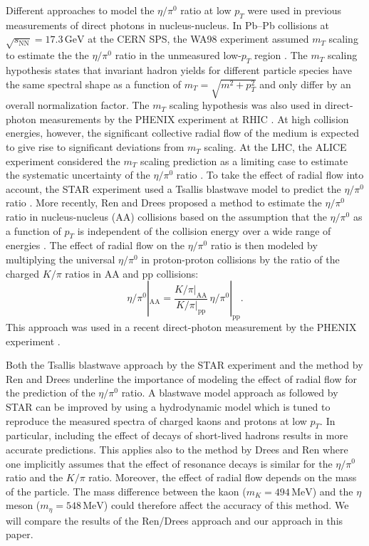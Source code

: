 \documentclass[%
 reprint,
 amsmath,amssymb,
 aps,
prc,
]{revtex4-2}
\begin{document}
Different approaches to model the $\eta/\pi^0$ ratio at low $p_T$ were used in previous measurements of direct photons in nucleus-nucleus. In Pb--Pb collisions at $\sqrt{s_\mathrm{NN}} = 17.3\,\mathrm{GeV}$ at the CERN SPS, the WA98 experiment assumed $m_T$ scaling to estimate the the $\eta/\pi^0$ ratio in the unmeasured low-$p_T$ region \cite{WA98:2000vxl}. The $m_T$ scaling hypothesis states that invariant hadron yields for different particle species have the same spectral shape as a function of $m_T = \sqrt{m^2+p_T^2}$ and only differ by an overall normalization factor. The $m_T$ scaling hypothesis was also used in direct-photon measurements by the PHENIX experiment at RHIC \cite{PHENIX:2008uif}. At high collision energies, however, the significant collective radial flow of the medium is expected to give rise to significant deviations from $m_T$ scaling. At the LHC, the ALICE experiment considered the $m_T$ scaling prediction as a limiting case to estimate the systematic uncertainty of the $\eta/\pi^0$ ratio \cite{ALICE:2015xmh}. To take the effect of radial flow into account, the STAR experiment used a Tsallis blastwave model to predict the $\eta/\pi^0$ ratio \cite{STAR:2016use}. More recently, Ren and Drees proposed a method to estimate the $\eta/\pi^0$ ratio in nucleus-nucleus (AA) collisions based on the assumption that the $\eta/\pi^0$ as a function of $p_T$ is independent of the collision energy over a wide range of energies \cite{Ren:2021pzi}. The effect of radial flow on the $\eta/\pi^0$ ratio is then modeled by multiplying the universal $\eta/\pi^0$ in proton-proton collisions by the ratio of the charged $K/\pi$ ratios in AA and pp collisions:
\begin{equation}
\eta/\pi^0|_\mathrm{AA} = \frac{K/\pi|_\mathrm{AA}}{K/\pi|_\mathrm{pp}} \, \eta/\pi^0|_\mathrm{pp}.
\end{equation}
This approach was used in a recent direct-photon measurement by the PHENIX experiment \cite{PHENIX:2022rsx}. 

Both the Tsallis blastwave approach by the STAR experiment and the method by Ren and Drees underline the importance of modeling the effect of radial flow for the prediction of the $\eta/\pi^0$ ratio. A blastwave model approach as followed by STAR can be improved by using a hydrodynamic model which is tuned to reproduce the measured spectra of charged kaons and protons at low $p_T$. In particular, including the effect of decays of short-lived hadrons results in more accurate predictions. This applies also to the method by Drees and Ren where one implicitly assumes that the effect of resonance decays is similar for the $\eta/\pi^0$ ratio and the $K/\pi$ ratio. Moreover, the effect of radial flow depends on the mass of the particle. The mass difference between the kaon ($m_K = 494\,\mathrm{MeV}$) and the $\eta$ meson ($m_\eta = 548\,\mathrm{MeV}$) could therefore affect the accuracy of this method. We will compare the results of the Ren/Drees approach and our approach in this paper.
\end{document}
